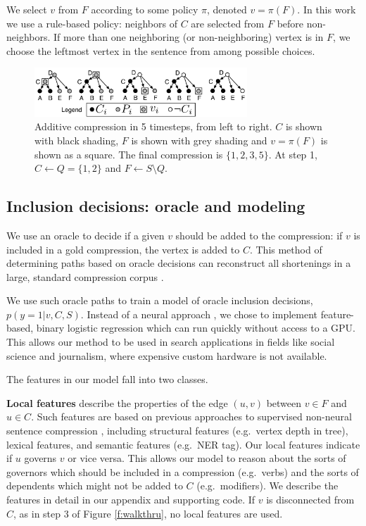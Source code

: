\documentclass[11pt,a4paper]{article}
\begin{document}
We select $v$ from $F$ according to some policy $\pi$, denoted $v = \pi(F)$. In this work we use a rule-based policy: neighbors of $C$ are selected from $F$ before non-neighbors. If more than one neighboring (or non-neighboring) vertex is in $F$, we choose the leftmost vertex in the sentence from among possible choices.
 
\begin{figure}[h]
\includegraphics[width=8cm]{additive.pdf}
\caption{Additive compression in 5 timesteps, from left to right. $C$ is shown with black shading, $F$ is shown with grey shading and $v= \pi(F)$ is shown as a square. The final compression is $\{1,2,3,5\}$. At step 1, $C \gets Q = \{1,2\}$ and $F \gets S \setminus Q$.  }
\end{figure}\label{f:walkthru}


\subsection{Inclusion decisions: oracle and modeling}\label{s:modeling}

We use an oracle to decide if a given $v$ should be added to the compression: if $v$ is included in a gold compression, the vertex is added to $C$. This method of determining paths based on oracle decisions can reconstruct all shortenings in a large, standard compression corpus \cite{filippova2013overcoming}.

We use such oracle paths to train a model of oracle inclusion decisions, $p(y  = 1 | v, C, S)$. Instead of a neural approach \cite{D14-1082}, we chose to implement feature-based, binary logistic regression which can run quickly without access to a GPU. This allows our method to be used in search applications in fields like social science and journalism, where expensive custom hardware is not available. 

The features in our model fall into two classes. 

\textbf{Local features} describe the properties of the edge $(u,v)$ between $v \in F$ and $u \in C$. Such features are based on previous approaches to supervised non-neural sentence compression \cite{filippova2013overcoming,almeida2013fast,Filippova2015FastKS}, including structural features (e.g.~vertex depth in tree), lexical features, and semantic features (e.g.~NER tag). Our local features indicate if $u$ governs $v$ or vice versa. This allows our model to reason about the sorts of governors which should be included in a compression (e.g.~verbs) and the sorts of dependents which might not be added to $C$ (e.g.~modifiers). We describe the features in detail in our appendix and supporting code. If $v$ is disconnected from $C$, as in step 3 of Figure \ref{f:walkthru}, no local features are used.
\end{document}
